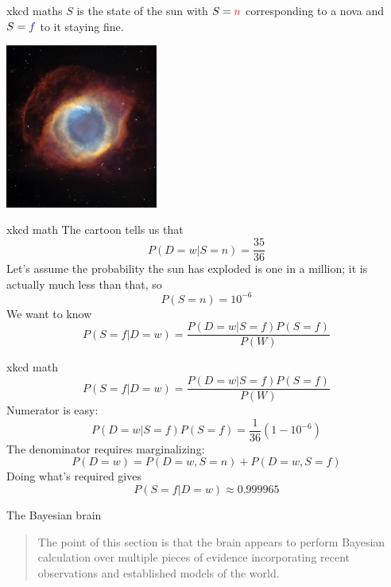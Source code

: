 \documentclass{beamer}
\newcommand{\crish}{\color{reddish}}
\newcommand{\cbla}{\color{black}}
\newcommand{\cred}{\color{red}}
\newcommand{\cblu}{\color{blue}}
\begin{document}
\begin{frame}{xkcd maths}
  \crish$S$\cbla{} is the state of the \color{orange}sun\cbla{} with
  \crish$S=\cred{}n$\cbla{}  corresponding to a \cred{}nova\cbla{} and \crish$S=\cblu{}f$\cbla{} to it staying fine. 
\begin{center}
\includegraphics[width=5cm]{nebula.jpg}
\end{center}
\vfill
{}
\end{frame}

\begin{frame}{xkcd math}
  The cartoon tells us that
  \crish$$
  P(D=w|S=n)=\frac{35}{36}
  $$\cbla{}
\vskip 1cm
Let's assume the probability the sun has exploded is one
in a million; it is actually much less than that, so
\crish$$
P(S=n)=10^{-6}
$$\cbla{}
We want to know
\crish$$
P(S=f|D=w)=\frac{P(D=w|S=f)P(S=f)}{P(W)}
$$\cbla{}
\end{frame}


\begin{frame}{xkcd math}
\crish$$
P(S=f|D=w)=\frac{P(D=w|S=f)P(S=f)}{P(W)}
$$\cbla{}
Numerator is easy:
\crish$$
P(D=w|S=f)P(S=f)=\frac{1}{36}(1-10^{-6})
$$\cbla{}
The denominator requires marginalizing:
\crish$$
P(D=w)=P(D=w,S=n)+P(D=w,S=f)
$$\cbla{}
\vskip 1cm
Doing what's required gives
\crish$$
P(S=f|D=w)\approx 0.999965
$$\cbla{}
\end{frame}

\begin{frame}{The Bayesian brain}
  \begin{quote}The point of this section is that the brain appears to perform Bayesian calculation over multiple pieces of evidence incorporating recent observations and established models of the world.
  \end{quote}
\end{frame}
\end{document}
